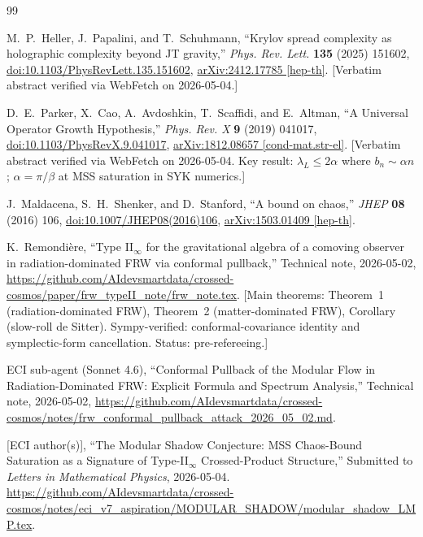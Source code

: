 \documentclass[12pt,a4paper]{article}
\theoremstyle{definition}
\begin{document}
\begin{thebibliography}{99}

M.~P.~Heller, J.~Papalini, and T.~Schuhmann,
``Krylov spread complexity as holographic complexity beyond JT gravity,''
\textit{Phys. Rev. Lett.} \textbf{135} (2025) 151602,
\href{https://doi.org/10.1103/PhysRevLett.135.151602}{doi:10.1103/PhysRevLett.135.151602},
\href{https://arxiv.org/abs/2412.17785}{arXiv:2412.17785 [hep-th]}.
[Verbatim abstract verified via WebFetch on 2026-05-04.]

D.~E.~Parker, X.~Cao, A.~Avdoshkin, T.~Scaffidi, and E.~Altman,
``A Universal Operator Growth Hypothesis,''
\textit{Phys. Rev. X} \textbf{9} (2019) 041017,
\href{https://doi.org/10.1103/PhysRevX.9.041017}{doi:10.1103/PhysRevX.9.041017},
\href{https://arxiv.org/abs/1812.08657}{arXiv:1812.08657 [cond-mat.str-el]}.
[Verbatim abstract verified via WebFetch on 2026-05-04.
Key result: $\lambda_L \le 2\alpha$ where $b_n \sim \alpha n$;
$\alpha = \pi/\beta$ at MSS saturation in SYK numerics.]

J.~Maldacena, S.~H.~Shenker, and D.~Stanford,
``A bound on chaos,''
\textit{JHEP} \textbf{08} (2016) 106,
\href{https://doi.org/10.1007/JHEP08(2016)106}{doi:10.1007/JHEP08(2016)106},
\href{https://arxiv.org/abs/1503.01409}{arXiv:1503.01409 [hep-th]}.

K.~Remondi\`{e}re,
``Type II$_\infty$ for the gravitational algebra of a comoving observer
in radiation-dominated FRW via conformal pullback,''
Technical note, 2026-05-02,
\url{https://github.com/AIdevsmartdata/crossed-cosmos/paper/frw_typeII_note/frw_note.tex}.
[Main theorems: Theorem~1 (radiation-dominated FRW), Theorem~2
(matter-dominated FRW), Corollary (slow-roll de Sitter).
Sympy-verified: conformal-covariance identity and symplectic-form cancellation.
Status: pre-refereeing.]

ECI sub-agent (Sonnet 4.6),
``Conformal Pullback of the Modular Flow in Radiation-Dominated FRW:
Explicit Formula and Spectrum Analysis,''
Technical note, 2026-05-02,
\url{https://github.com/AIdevsmartdata/crossed-cosmos/notes/frw_conformal_pullback_attack_2026_05_02.md}.

[ECI author(s)],
``The Modular Shadow Conjecture:
MSS Chaos-Bound Saturation as a Signature of Type-II$_\infty$
Crossed-Product Structure,''
Submitted to \textit{Letters in Mathematical Physics}, 2026-05-04.
\url{https://github.com/AIdevsmartdata/crossed-cosmos/notes/eci_v7_aspiration/MODULAR_SHADOW/modular_shadow_LMP.tex}.


\end{thebibliography}
\end{document}
